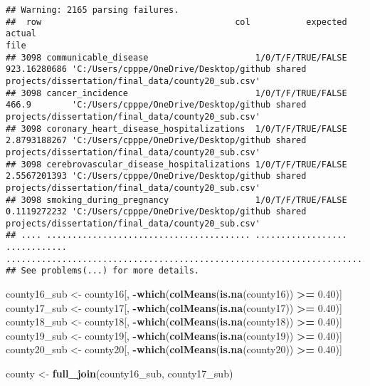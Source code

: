 \documentclass[
]{article}
\newenvironment{Shaded}{\begin{snugshade}}{\end{snugshade}}
\newcommand{\FloatTok}[1]{\textcolor[rgb]{0.00,0.00,0.81}{#1}}
\newcommand{\KeywordTok}[1]{\textcolor[rgb]{0.13,0.29,0.53}{\textbf{#1}}}
\newcommand{\NormalTok}[1]{#1}
\newcommand{\OperatorTok}[1]{\textcolor[rgb]{0.81,0.36,0.00}{\textbf{#1}}}
\newcommand{\StringTok}[1]{\textcolor[rgb]{0.31,0.60,0.02}{#1}}
\begin{document}
\begin{verbatim}
## Warning: 2165 parsing failures.
##  row                                      col           expected       actual                                                                                              file
## 3098 communicable_disease                     1/0/T/F/TRUE/FALSE 923.16280686 'C:/Users/cpppe/OneDrive/Desktop/github shared projects/dissertation/final_data/county20_sub.csv'
## 3098 cancer_incidence                         1/0/T/F/TRUE/FALSE 466.9        'C:/Users/cpppe/OneDrive/Desktop/github shared projects/dissertation/final_data/county20_sub.csv'
## 3098 coronary_heart_disease_hospitalizations  1/0/T/F/TRUE/FALSE 2.8793188267 'C:/Users/cpppe/OneDrive/Desktop/github shared projects/dissertation/final_data/county20_sub.csv'
## 3098 cerebrovascular_disease_hospitalizations 1/0/T/F/TRUE/FALSE 2.5567201393 'C:/Users/cpppe/OneDrive/Desktop/github shared projects/dissertation/final_data/county20_sub.csv'
## 3098 smoking_during_pregnancy                 1/0/T/F/TRUE/FALSE 0.1119272232 'C:/Users/cpppe/OneDrive/Desktop/github shared projects/dissertation/final_data/county20_sub.csv'
## .... ........................................ .................. ............ .................................................................................................
## See problems(...) for more details.
\end{verbatim}

\begin{Shaded}
\begin{Highlighting}[]
\NormalTok{county16_sub <-}\StringTok{ }\NormalTok{county16[, }\OperatorTok{-}\KeywordTok{which}\NormalTok{(}\KeywordTok{colMeans}\NormalTok{(}\KeywordTok{is.na}\NormalTok{(county16)) }\OperatorTok{>=}\StringTok{ }\FloatTok{0.40}\NormalTok{)]}
\NormalTok{county17_sub <-}\StringTok{ }\NormalTok{county17[, }\OperatorTok{-}\KeywordTok{which}\NormalTok{(}\KeywordTok{colMeans}\NormalTok{(}\KeywordTok{is.na}\NormalTok{(county17)) }\OperatorTok{>=}\StringTok{ }\FloatTok{0.40}\NormalTok{)]}
\NormalTok{county18_sub <-}\StringTok{ }\NormalTok{county18[, }\OperatorTok{-}\KeywordTok{which}\NormalTok{(}\KeywordTok{colMeans}\NormalTok{(}\KeywordTok{is.na}\NormalTok{(county18)) }\OperatorTok{>=}\StringTok{ }\FloatTok{0.40}\NormalTok{)]}
\NormalTok{county19_sub <-}\StringTok{ }\NormalTok{county19[, }\OperatorTok{-}\KeywordTok{which}\NormalTok{(}\KeywordTok{colMeans}\NormalTok{(}\KeywordTok{is.na}\NormalTok{(county19)) }\OperatorTok{>=}\StringTok{ }\FloatTok{0.40}\NormalTok{)]}
\NormalTok{county20_sub <-}\StringTok{ }\NormalTok{county20[, }\OperatorTok{-}\KeywordTok{which}\NormalTok{(}\KeywordTok{colMeans}\NormalTok{(}\KeywordTok{is.na}\NormalTok{(county20)) }\OperatorTok{>=}\StringTok{ }\FloatTok{0.40}\NormalTok{)]}

\NormalTok{county <-}\StringTok{ }\KeywordTok{full_join}\NormalTok{(county16_sub, county17_sub)}
\end{Highlighting}
\end{Shaded}
\end{document}
